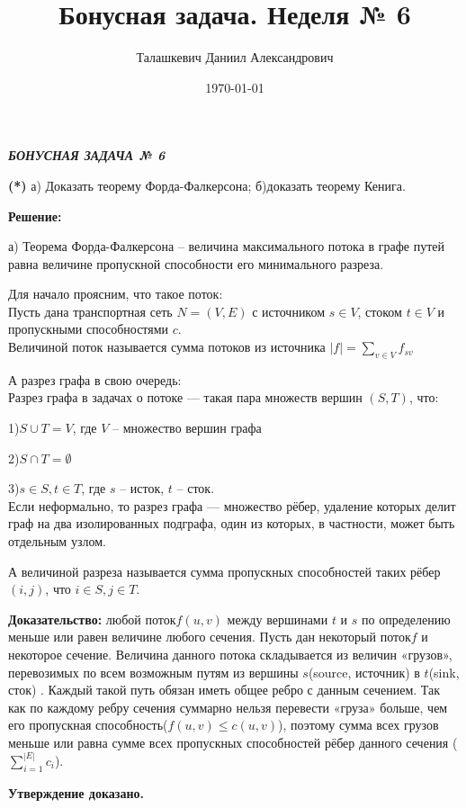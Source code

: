 \documentclass[a4paper,12pt]{article} %
\author{Талашкевич Даниил Александрович}
\title{Бонусная задача. Неделя № 6}
\date{\today}
\begin{document}
\maketitle
\thispagestyle{empty}

\newpage
\setcounter{page}{1}
\begin{center}
\itshape
\bfseries
{ \Large БОНУСНАЯ ЗАДАЧА № 6}
\end{center}

{\bf (*) }а) Доказать теорему Форда-Фалкерсона; б)доказать теорему Кенига.
\begin{center}
\bfseries
{\Large Решение: }
\end{center}

а) Теорема Форда-Фалкерсона -- величина максимального потока в графе путей равна величине пропускной способности его минимального разреза.

Для начало проясним, что такое поток:\\
Пусть дана транспортная сеть $N=(V,E)$ с источником $s\in V$, стоком $t\in V$ и пропускными способностями $c$.\\
Величиной поток называется сумма потоков из источника $ |f|=\sum _{{v\in V}}f_{{sv}}$

А разрез графа в свою очередь:\\
Разрез графа в задачах о потоке — такая пара множеств вершин $(S,T)$, что:

1)$S\cup T=V$, где $V$ -- множество вершин графа

2)$S\cap T=\emptyset$

3)$s\in S,t\in T$, где $s$ -- исток, $t$ -- сток.\\
Если неформально, то разрез графа — множество рёбер, удаление которых делит граф на два изолированных подграфа, один из которых, в частности, может быть отдельным узлом.

А величиной разреза называется сумма пропускных способностей таких рёбер $(i, j)$, что $i\in S,j\in T$.

{\bf Доказательство:}  любой поток$f(u,v)$ между вершинами $t$ и $s$  по определению меньше или равен величине любого сечения. Пусть дан некоторый поток$f$ и некоторое сечение. Величина данного потока складывается из величин «грузов», перевозимых по всем возможным путям из вершины $s$(source, источник) в $t$(sink, сток) . Каждый такой путь обязан иметь общее ребро с данным сечением. Так как по каждому ребру сечения суммарно нельзя перевести «груза» больше, чем его пропускная способность($ f(u,v)\leqslant c (u, v) $), поэтому сумма всех грузов меньше или равна сумме всех пропускных способностей рёбер данного сечения ($\sum\limits_{i = 1}^{|E|}c_i$). 
\begin{flushright}
\begin{large}
\textbf {Утверждение доказано. }
\end{large}
\end{flushright}
\end{document}
